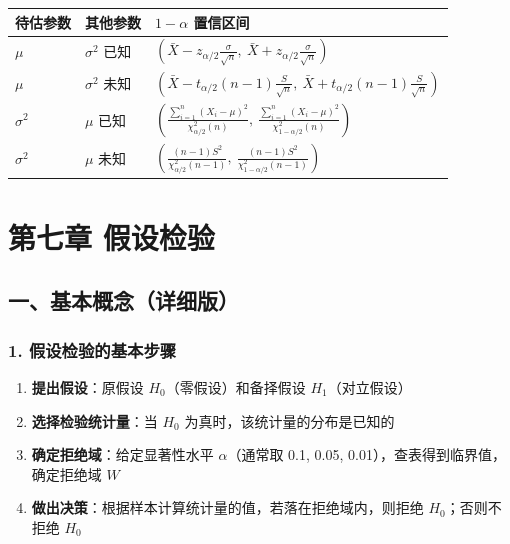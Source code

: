\documentclass[12pt,a4paper]{ctexart}
\begin{document}
\begin{center}
    \begin{tabular}{@{}lll@{}}
        \toprule
        \textbf{待估参数} & \textbf{其他参数} & \textbf{$1-\alpha$ 置信区间}                                                                                                           \\
        \midrule
        $\mu$         & $\sigma^2$ 已知 & $\left(\bar{X} - z_{\alpha/2} \frac{\sigma}{\sqrt{n}},\ \bar{X} + z_{\alpha/2} \frac{\sigma}{\sqrt{n}}\right)$                     \\
        $\mu$         & $\sigma^2$ 未知 & $\left(\bar{X} - t_{\alpha/2}(n-1) \frac{S}{\sqrt{n}},\ \bar{X} + t_{\alpha/2}(n-1) \frac{S}{\sqrt{n}}\right)$                     \\
        $\sigma^2$    & $\mu$ 已知      & $\left(\frac{\sum_{i=1}^n (X_i - \mu)^2}{\chi^2_{\alpha/2}(n)},\ \frac{\sum_{i=1}^n (X_i - \mu)^2}{\chi^2_{1-\alpha/2}(n)}\right)$ \\
        $\sigma^2$    & $\mu$ 未知      & $\left(\frac{(n-1)S^2}{\chi^2_{\alpha/2}(n-1)},\ \frac{(n-1)S^2}{\chi^2_{1-\alpha/2}(n-1)}\right)$                                 \\
        \bottomrule
    \end{tabular}
\end{center}

\newpage
\section{第七章 假设检验}

\subsection{一、基本概念（详细版）}

\subsubsection{1. 假设检验的基本步骤}
\begin{enumerate}[noitemsep]
    \item \textbf{提出假设}：原假设 $H_0$（零假设）和备择假设 $H_1$（对立假设）
    \item \textbf{选择检验统计量}：当 $H_0$ 为真时，该统计量的分布是已知的
    \item \textbf{确定拒绝域}：给定显著性水平 $\alpha$（通常取 0.1, 0.05, 0.01），查表得到临界值，确定拒绝域 $W$
    \item \textbf{做出决策}：根据样本计算统计量的值，若落在拒绝域内，则拒绝 $H_0$；否则不拒绝 $H_0$
\end{enumerate}
\end{document}
